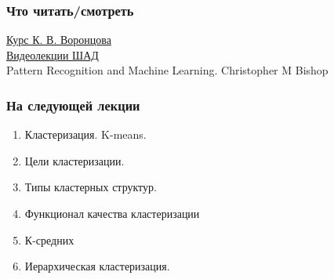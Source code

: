 \documentclass[10pt]{beamer}
\begin{document}
	

\begin{frame}\frametitle{Что читать/смотреть}
	\href{http://www.machinelearning.ru/wiki/images/6/6d/Voron-ML-1.pdf}{Курс К. В. Воронцова}\\
	\href{https://yandexdataschool.ru/edu-process/courses/machine-learning}{Видеолекции ШАД}\\
	Pattern Recognition and Machine Learning. Christopher M Bishop
\end{frame}

\begin{frame}\frametitle{На следующей лекции}
	\begin{enumerate} [--]
		\item Кластеризация.  K-means.
		\item Цели кластеризации.
		\item Типы кластерных структур.
		\item Функционал качества кластеризации
		\item К-средних
		\item Иерархическая кластеризация.
	\end{enumerate}
\end{frame}
\end{document}
